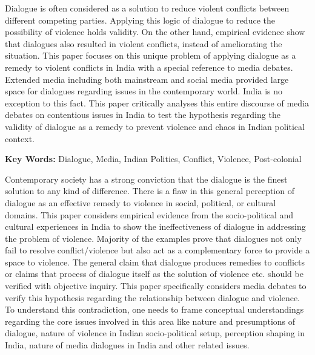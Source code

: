 \setcounter{figure}{0}
\setcounter{table}{0}
\setcounter{footnote}{0}


\begin{multicols}{2}


\noi
Dialogue is often considered as a solution to reduce violent conflicts between different competing
parties. Applying this logic of dialogue to reduce the possibility of violence holds validity. On the
other hand, empirical evidence show that dialogues also resulted in violent conflicts, instead of
ameliorating the situation. This paper focuses on this unique problem of applying dialogue as a
remedy to violent conflicts in India with a special reference to media debates. Extended media
including both mainstream and social media provided large space for dialogues regarding issues
in the contemporary world. India is no exception to this fact. This paper critically analyses this
entire discourse of media debates on contentious issues in India to test the hypothesis regarding
the validity of dialogue as a remedy to prevent violence and chaos in Indian political context.

\noi
\textbf{Key Words:} Dialogue, Media, Indian Politics, Conflict, Violence, Post-colonial


\noi
Contemporary society has a strong conviction that the dialogue is the finest solution to any kind
of difference. There is a flaw in this general perception of dialogue as an effective remedy to
violence in social, political, or cultural domains. This paper considers empirical evidence from
the socio-political and cultural experiences in India to show the ineffectiveness of dialogue in
addressing the problem of violence. Majority of the examples prove that dialogues not only fail
to resolve conflict/violence but also act as a complementary force to provide a space to violence.
The general claim that dialogue produces remedies to conflicts or claims that process of dialogue
itself as the solution of violence etc. should be verified with objective inquiry. This paper
specifically considers media debates to verify this hypothesis regarding the relationship between
dialogue and violence. To understand this contradiction, one needs to frame conceptual
understandings regarding the core issues involved in this area like nature and presumptions of
dialogue, nature of violence in Indian socio-political setup, perception shaping in India, nature of
media dialogues in India and other related issues.


\end{multicols}
